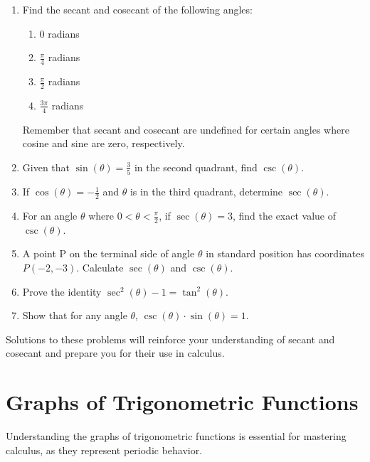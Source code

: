 \documentclass[a4paper,12pt]{book}
\newcounter{problem}
\begin{document}
\begin{enumerate}
    \item Find the secant and cosecant of the following angles:
    \begin{enumerate}[label=(\alph*)]
        \item \( 0 \) radians
        \item \( \frac{\pi}{4} \) radians
        \item \( \frac{\pi}{2} \) radians
        \item \( \frac{3\pi}{4} \) radians
    \end{enumerate}
    Remember that secant and cosecant are undefined for certain angles where cosine and sine are zero, respectively.

    \item Given that \( \sin(\theta) = \frac{3}{5} \) in the second quadrant, find \( \csc(\theta) \).

    \item If \( \cos(\theta) = -\frac{1}{2} \) and \( \theta \) is in the third quadrant, determine \( \sec(\theta) \).

    \item For an angle \( \theta \) where \( 0 < \theta < \frac{\pi}{2} \), if \( \sec(\theta) = 3 \), find the exact value of \( \csc(\theta) \).
    
    \item A point P on the terminal side of angle \( \theta \) in standard position has coordinates \( P(-2, -3) \). Calculate \( \sec(\theta) \) and \( \csc(\theta) \).
    
    \item Prove the identity \( \sec^2(\theta) - 1 = \tan^2(\theta) \).
    
    \item Show that for any angle \( \theta \), \( \csc(\theta) \cdot \sin(\theta) = 1 \).

\end{enumerate}

Solutions to these problems will reinforce your understanding of secant and cosecant and prepare you for their use in calculus.


\section{Graphs of Trigonometric Functions}
\label{sec:graphs_trig_functions}
Understanding the graphs of trigonometric functions is essential for mastering calculus, as they represent periodic behavior.
\end{document}
